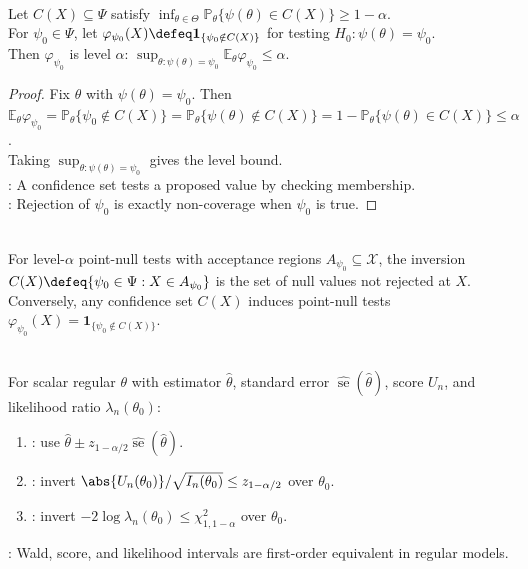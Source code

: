 \begin{proposition} \label{prop:confidence-test-converse-duality} \\
Let $C(X)\subseteq\Psi$ satisfy $\inf_{\theta\in\Theta}\mathbb{P}_\theta\{\psi(\theta)\in C(X)\}\geq1-\alpha$.\\
For $\psi_0\in\Psi$, let $\varphi_{\psi_0}(X)\defeq\mathbf{1}_{\{\psi_0\notin C(X)\}}$ for testing $H_0:\psi(\theta)=\psi_0$.\\
Then $\varphi_{\psi_0}$ is level $\alpha$: $\sup_{\theta:\psi(\theta)=\psi_0}\mathbb{E}_\theta\varphi_{\psi_0}\leq\alpha$.
\begin{proof} Fix $\theta$ with $\psi(\theta)=\psi_0$. Then $\mathbb{E}_\theta\varphi_{\psi_0}=\mathbb{P}_\theta\{\psi_0\notin C(X)\}=\mathbb{P}_\theta\{\psi(\theta)\notin C(X)\}=1-\mathbb{P}_\theta\{\psi(\theta)\in C(X)\}\leq\alpha$.\\
Taking $\sup_{\theta:\psi(\theta)=\psi_0}$ gives the level bound.\\
: A confidence set tests a proposed value by checking membership.\\
: Rejection of $\psi_0$ is exactly non-coverage when $\psi_0$ is true.
\end{proof}
\end{proposition}

\begin{remark} \label{rem:duality-acceptance-regions} \\
For level-$\alpha$ point-null tests with acceptance regions $A_{\psi_0}\subseteq\mathcal{X}$, the inversion $C(X)\defeq\{\psi_0\in\Psi:X\in A_{\psi_0}\}$ is the set of null values not rejected at $X$.\\
Conversely, any confidence set $C(X)$ induces point-null tests $\varphi_{\psi_0}(X)=\mathbf{1}_{\{\psi_0\notin C(X)\}}$.
\end{remark}

\begin{definition} \label{def:wald-score-likelihood-intervals} \\
For scalar regular $\theta$ with estimator $\widehat{\theta}$, standard error $\widehat{\operatorname{se}}(\widehat{\theta})$, score $U_n$, and likelihood ratio $\lambda_n(\theta_0)$:
\begin{enumerate}[label=(\roman*)]
\setlength{\itemsep}{0pt}
\item {}: use $\widehat{\theta}\pm z_{1-\alpha/2}\widehat{\operatorname{se}}(\widehat{\theta})$.
\item {}: invert $\abs{U_n(\theta_0)}/\sqrt{I_n(\theta_0)}\leq z_{1-\alpha/2}$ over $\theta_0$.
\item {}: invert $-2\log\lambda_n(\theta_0)\leq\chi^2_{1,1-\alpha}$ over $\theta_0$.
\end{enumerate}
: Wald, score, and likelihood intervals are first-order equivalent in regular models.
\end{definition}

